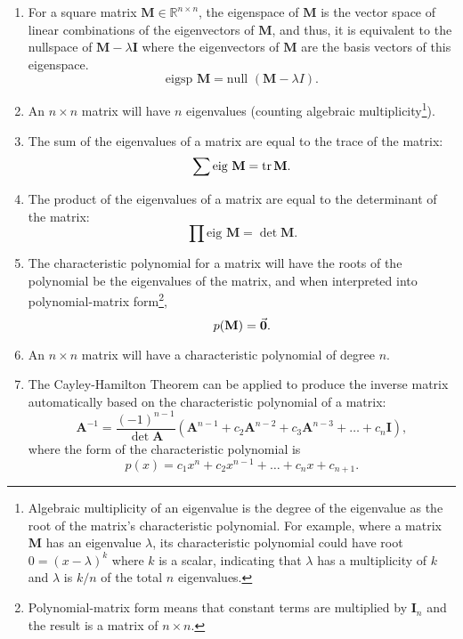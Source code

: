 \documentclass[12pt]{article}
\newcommand{\mat}[1]{\mathbf{#1}}
\newcommand{\eig}{\text{eig }}
\newcommand{\nullsp}{\text{null }}
\newcommand{\eigsp}{\text{eigsp }}
\begin{document}
\begin{enumerate}
\item For a square matrix $\mat{M} \in \mathbb{R}^{n \times n}$, the eigenspace of $\mat{M}$ is the vector space of linear combinations of the eigenvectors of $\mat{M}$, and thus, it is equivalent to the nullspace of $\mat{M} - \lambda \mat{I}$ where the eigenvectors of $\mat{M}$ are the basis vectors of this eigenspace.
\begin{equation}
\eigsp \mat{M} = \nullsp ( \mat{M} - \lambda I ).
\end{equation}
\item An $n \times n$ matrix will have $n$ eigenvalues (counting algebraic multiplicity\footnote{Algebraic multiplicity of an eigenvalue is the degree of the eigenvalue as the root of the matrix's characteristic polynomial. For example, where a matrix $\mat{M}$ has an eigenvalue $\lambda$, its characteristic polynomial could have root $0 = (x-\lambda)^{k}$ where $k$ is a scalar, indicating that $\lambda$ has a multiplicity of $k$ and $\lambda$ is $k/n$ of the total $n$ eigenvalues.}).
\item The sum of the eigenvalues of a matrix are equal to the trace of the matrix:
\begin{equation}
\sum \eig \mat{M} = \tr \mat{M}.
\end{equation}
\item The product of the eigenvalues of a matrix are equal to the determinant of the matrix:
\begin{equation}
\prod \eig \mat{M} = \det \mat{M}.
\end{equation}
\item The characteristic polynomial for a matrix will have the roots of the polynomial be the eigenvalues of the matrix, and when interpreted into polynomial-matrix form\footnote{Polynomial-matrix form means that constant terms are multiplied by $\mat{I}_{n}$ and the result is a matrix of $n \times n$.},
\begin{equation}
    p(\mat{M})=\va{0}.
\end{equation}
\item An $n \times n$ matrix will have a characteristic polynomial of degree $n$.
\item The Cayley-Hamilton Theorem can be applied to produce the inverse matrix automatically based on the characteristic polynomial of a matrix:
\begin{equation}
\mat{A}^{-1} = \frac{(-1)^{n-1}}{\det \mat{A}} (\mat{A}^{n-1} + c_{2} \mat{A}^{n-2} + c_{3} \mat{A}^{n-3} + \dots + c_{n} \mat{I}),
\end{equation}
where the form of the characteristic polynomial is
\begin{equation*}
p(x) = c_{1} x^{n} + c_{2} x^{n-1} + \dots + c_{n} x +  c_{n+1}.
\end{equation*}
\end{enumerate}
\end{document}
